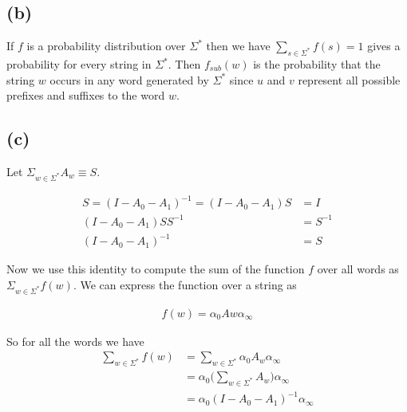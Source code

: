 \documentclass[11pt]{amsart}
\begin{document}
\subsection{(b)}

If $f$ is a probability distribution over $\Sigma^*$ then we have $\sum_{s \in \Sigma^*} f(s) = 1$ gives a probability for every string in $\Sigma^*$. Then $f_{sub}(w)$ is the probability that the string $w$ occurs in any word generated by $\Sigma^*$ since $u$ and $v$ represent all possible prefixes and suffixes to the word $w$.

\subsection{(c)}

Let $ \Sigma_{w \in \Sigma^*} A_w \equiv S$.

\begin{equation}
\begin{aligned}
S = (I - A_0 - A_1)^{-1} = (I - A_0 - A_1) S          &= I \\
				       (I - A_0 - A_1)SS^{-1} &= S^{-1}	\\
				       (I - A_0 - A_1)^{-1} 	&= S
\end{aligned}
\end{equation}

Now we use this identity to compute the sum of the function $f$ over all words as $ \Sigma_{w \in \Sigma^*} f(w)$. We can express the function over a string as

\begin{equation}
\begin{aligned}
f(w) = \alpha_0 Aw \alpha_{\infty}
\end{aligned}
\end{equation}

So for all the words we have
\begin{equation}
\begin{aligned}
\sum_{w \in \Sigma^*} f(w) &= \sum_{w \in \Sigma^*} \alpha_0 A_w \alpha_{\infty} \\
					 &= \alpha_0 \bigg( \sum_{w \in \Sigma^*}  A_w  \bigg) \alpha_{\infty} \\
					 &= \alpha_0 (I - A_0 - A_1)^{-1} \alpha_{\infty}
\end{aligned}
\end{equation}
\end{document}
